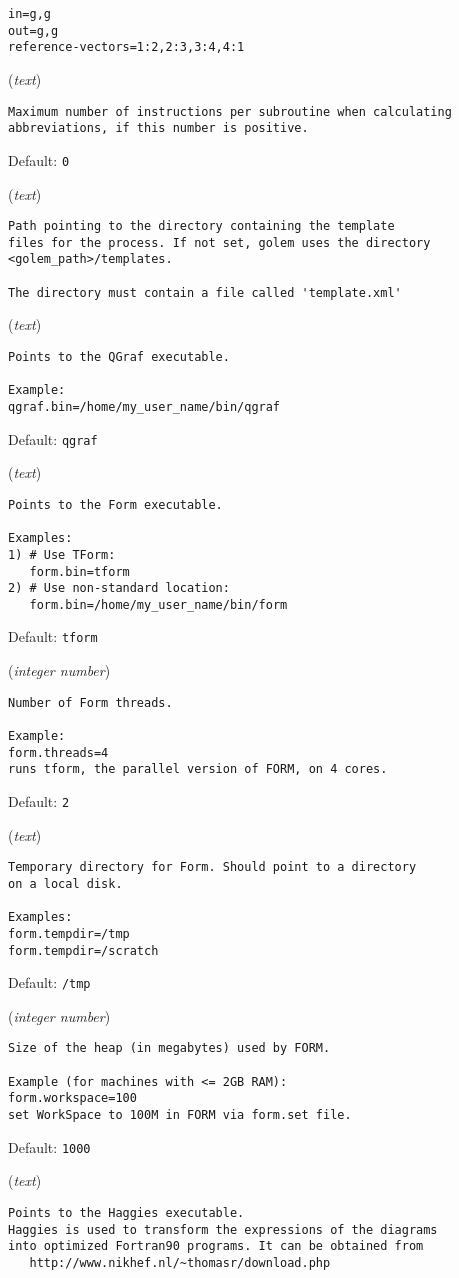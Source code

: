 \begin{description}
\begin{verbatim}
in=g,g
out=g,g
reference-vectors=1:2,2:3,3:4,4:1
\end{verbatim}
\item[\texttt{abbrev.limit}] (\textit{text})
\begin{verbatim}
Maximum number of instructions per subroutine when calculating
abbreviations, if this number is positive.
\end{verbatim}
Default: \verb|0|
\item[\texttt{templates}] (\textit{text})
\begin{verbatim}
Path pointing to the directory containing the template
files for the process. If not set, golem uses the directory
<golem_path>/templates.

The directory must contain a file called 'template.xml'
\end{verbatim}
\item[\texttt{qgraf.bin}] (\textit{text})
\begin{verbatim}
Points to the QGraf executable.

Example:
qgraf.bin=/home/my_user_name/bin/qgraf
\end{verbatim}
Default: \verb|qgraf|
\item[\texttt{form.bin}] (\textit{text})
\begin{verbatim}
Points to the Form executable.

Examples:
1) # Use TForm:
   form.bin=tform
2) # Use non-standard location:
   form.bin=/home/my_user_name/bin/form
\end{verbatim}
Default: \verb|tform|
\item[\texttt{form.threads}] (\textit{integer number})
\begin{verbatim}
Number of Form threads.

Example:
form.threads=4
runs tform, the parallel version of FORM, on 4 cores.
\end{verbatim}
Default: \verb|2|
\item[\texttt{form.tempdir}] (\textit{text})
\begin{verbatim}
Temporary directory for Form. Should point to a directory
on a local disk.

Examples:
form.tempdir=/tmp
form.tempdir=/scratch
\end{verbatim}
Default: \verb|/tmp|
\item[\texttt{form.workspace}] (\textit{integer number})
\begin{verbatim}
Size of the heap (in megabytes) used by FORM.

Example (for machines with <= 2GB RAM):
form.workspace=100
set WorkSpace to 100M in FORM via form.set file.
\end{verbatim}
Default: \verb|1000|
\item[\texttt{haggies.bin}] (\textit{text})
\begin{verbatim}
Points to the Haggies executable.
Haggies is used to transform the expressions of the diagrams
into optimized Fortran90 programs. It can be obtained from
   http://www.nikhef.nl/~thomasr/download.php


\end{verbatim}
\end{description}
